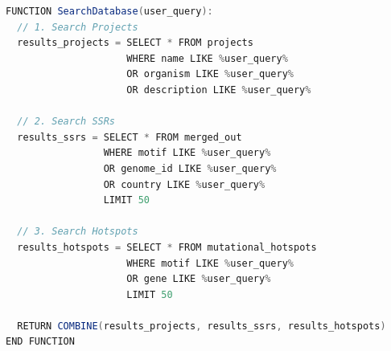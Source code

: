 \documentclass{article}
\begin{document}
\begin{lstlisting}[language=Java, caption=SearchDatabase Pseudocode]
FUNCTION SearchDatabase(user_query):
  // 1. Search Projects
  results_projects = SELECT * FROM projects 
                     WHERE name LIKE %user_query% 
                     OR organism LIKE %user_query%
                     OR description LIKE %user_query%

  // 2. Search SSRs
  results_ssrs = SELECT * FROM merged_out 
                 WHERE motif LIKE %user_query% 
                 OR genome_id LIKE %user_query%
                 OR country LIKE %user_query%
                 LIMIT 50

  // 3. Search Hotspots
  results_hotspots = SELECT * FROM mutational_hotspots 
                     WHERE motif LIKE %user_query% 
                     OR gene LIKE %user_query%
                     LIMIT 50

  RETURN COMBINE(results_projects, results_ssrs, results_hotspots)
END FUNCTION
\end{lstlisting}
\end{document}
